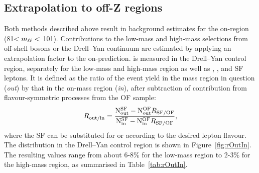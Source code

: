 \subsection{Extrapolation to off-Z regions}
\label{sec:ROutIn}
Both methods described above result in background estimates for the on-\Z region (81\GeV $< m_{\ell\ell} < $ 101\GeV). Contributions to the low-mass and high-mass selections from off-shell \Z bosons or the Drell--Yan continuum are estimated by applying an extrapolation factor \Routin to the on-\Z prediction. \Routin is measured in the Drell--Yan control region, separately for the low-mass and high-mass region as well as \EE, \MM, and SF leptons. It is defined as the ratio of the event yield in the mass region in question (\textit{out}) by that in the on-\Z mass region (\textit{in}), after subtraction of contribution from flavour-symmetric processes from the OF sample:
\begin{equation}
R_\text{out/in} = \frac{\mathrm{N}_{\mathrm{out}}^{\mathrm{SF}} - \mathrm{N}_{\mathrm{out}}^{\mathrm{OF}}R_{\text{SF/OF}}}{ \mathrm{N}_{\mathrm{in}}^{\mathrm{SF}} - \mathrm{N}_{\mathrm{in}}^{\mathrm{OF}}R_{\text{SF/OF}}},
\end{equation} 
where the SF can be substituted for \EE or \MM according to the desired lepton flavour. The \mll distribution in the Drell--Yan control region is shown in Figure~\ref{fig:rOutIn}. The resulting values range from about 6-8\% for the low-mass region to 2-3\% for the high-mass region, as summarised in Table~\ref{tab:rOutIn}.

